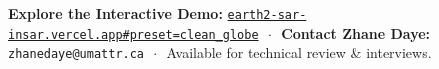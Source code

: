 \documentclass[10pt,letterpaper]{article}
\begin{document}
\vspace{-2pt}

\begin{tcolorbox}[colframe=planetblue,colback=planetblue,coltext=white,boxrule=0pt,top=4pt,bottom=4pt]
\centering\footnotesize
\textbf{Explore the Interactive Demo:} \href{https://earth2-sar-insar.vercel.app#preset=clean_globe&stage=v3}{\texttt{earth2-sar-insar.vercel.app\#preset=clean\_globe}} $\,\cdot\,$ 
\textbf{Contact Zhane Daye:} \texttt{zhanedaye@umattr.ca} $\,\cdot\,$ Available for technical review \& interviews.
\end{tcolorbox}
\end{document}
